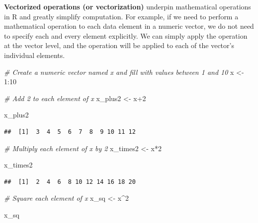 \documentclass[
]{book}
\newenvironment{Shaded}{\begin{snugshade}}{\end{snugshade}}
\newcommand{\CommentTok}[1]{\textcolor[rgb]{0.56,0.35,0.01}{\textit{#1}}}
\newcommand{\DecValTok}[1]{\textcolor[rgb]{0.00,0.00,0.81}{#1}}
\newcommand{\NormalTok}[1]{#1}
\newcommand{\OtherTok}[1]{\textcolor[rgb]{0.56,0.35,0.01}{#1}}
\newcommand{\SpecialCharTok}[1]{\textcolor[rgb]{0.00,0.00,0.00}{#1}}
\begin{document}
\textbf{Vectorized operations (or vectorization)} underpin mathematical operations in R and greatly simplify computation. For example, if we need to perform a mathematical operation to each data element in a numeric vector, we do not need to specify each and every element explicitly. We can simply apply the operation at the vector level, and the operation will be applied to each of the vector's individual elements.

\begin{Shaded}
\begin{Highlighting}[]
\CommentTok{\# Create a numeric vector named x and fill with values between 1 and 10}
\NormalTok{x }\OtherTok{\textless{}{-}} \DecValTok{1}\SpecialCharTok{:}\DecValTok{10}
\end{Highlighting}
\end{Shaded}

\begin{Shaded}
\begin{Highlighting}[]
\CommentTok{\# Add 2 to each element of x}
\NormalTok{x\_plus2 }\OtherTok{\textless{}{-}}\NormalTok{ x}\SpecialCharTok{+}\DecValTok{2}

\NormalTok{x\_plus2}
\end{Highlighting}
\end{Shaded}

\begin{verbatim}
##  [1]  3  4  5  6  7  8  9 10 11 12
\end{verbatim}

\begin{Shaded}
\begin{Highlighting}[]
\CommentTok{\# Multiply each element of x by 2}
\NormalTok{x\_times2 }\OtherTok{\textless{}{-}}\NormalTok{ x}\SpecialCharTok{*}\DecValTok{2}

\NormalTok{x\_times2}
\end{Highlighting}
\end{Shaded}

\begin{verbatim}
##  [1]  2  4  6  8 10 12 14 16 18 20
\end{verbatim}

\begin{Shaded}
\begin{Highlighting}[]
\CommentTok{\# Square each element of x}
\NormalTok{x\_sq }\OtherTok{\textless{}{-}}\NormalTok{ x}\SpecialCharTok{\^{}}\DecValTok{2}

\NormalTok{x\_sq}
\end{Highlighting}
\end{Shaded}
\end{document}
